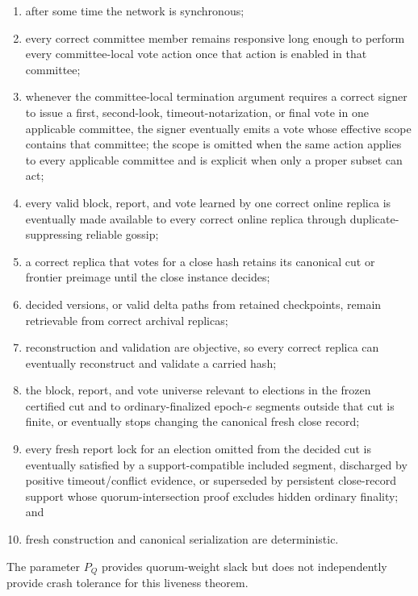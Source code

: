 \documentclass[sigplan,twocolumn,review,anonymous]{acmart}
\begin{document}
\begin{enumerate}
\item after some time the network is synchronous;
\item every correct committee member remains responsive long enough to perform every committee-local
      vote action once that action is enabled in that committee;
\item whenever the committee-local termination argument requires a correct signer to issue a first,
      second-look, timeout-notarization, or final vote in one applicable committee, the signer eventually
      emits a vote whose effective scope contains that committee; the scope is omitted when the same
      action applies to every applicable committee and is explicit when only a proper subset can act;
\item every valid block, report, and vote learned by one correct online replica is eventually made
      available to every correct online replica through duplicate-suppressing reliable gossip;
\item a correct replica that votes for a close hash retains its canonical cut or frontier preimage until
      the close instance decides;
\item decided versions, or valid delta paths from retained checkpoints, remain retrievable from correct
      archival replicas;
\item reconstruction and validation are objective, so every correct replica can eventually reconstruct
      and validate a carried hash;
\item the block, report, and vote universe relevant to elections in the frozen certified cut and to
      ordinary-finalized epoch-\(e\) segments outside that cut is finite, or eventually stops changing the
      canonical fresh close record;
\item every fresh report lock for an election omitted from the decided cut is eventually satisfied by a
      support-compatible included segment, discharged by positive timeout/conflict evidence, or superseded
      by persistent close-record support whose quorum-intersection proof excludes hidden ordinary finality;
      and
\item fresh construction and canonical serialization are deterministic.
\end{enumerate}

The parameter \(P_Q\) provides quorum-weight slack but does not independently provide crash tolerance for
this liveness theorem.
\end{document}
